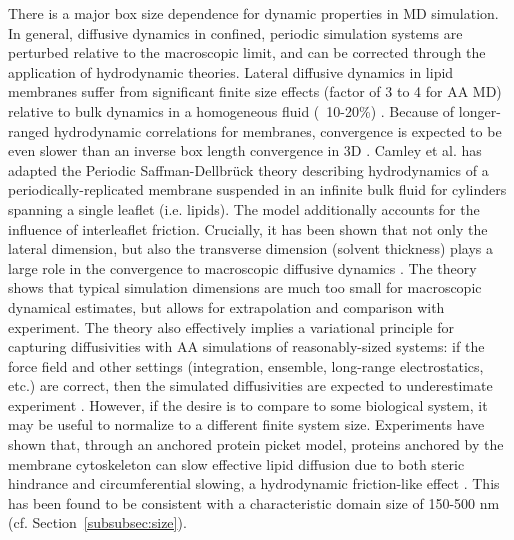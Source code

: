 \documentclass[9pt,bestpractices]{livecoms}
\begin{document}
There is a major box size dependence for dynamic properties in MD simulation.
In general, diffusive dynamics in confined, periodic simulation systems are perturbed relative to the macroscopic limit, and can be corrected through the application of hydrodynamic theories.
Lateral diffusive dynamics in lipid membranes suffer from significant finite size effects (factor of 3 to 4 for AA MD) \cite{Venable2017} relative to bulk dynamics in a homogeneous fluid (~10-20\%) \cite{Yeh2004c}.
Because of longer-ranged hydrodynamic correlations for membranes, convergence is expected to be even slower than an inverse box length convergence in 3D \cite{Camley2013a}.
Camley et al. has adapted the Periodic Saffman-Dellbr\"uck theory describing hydrodynamics of a periodically-replicated membrane suspended in an infinite bulk fluid for cylinders spanning a single leaflet (i.e. lipids).
The model additionally accounts for the influence of interleaflet friction.
Crucially, it has been shown that not only the lateral dimension, but also the transverse dimension (solvent thickness) plays a large role in the convergence to macroscopic diffusive dynamics \cite{Venable2017}.
The theory shows that typical simulation dimensions are much too small for macroscopic dynamical estimates, but allows for extrapolation and comparison with experiment.
The theory also effectively implies a variational principle for capturing diffusivities with AA simulations of reasonably-sized systems: if the force field and other settings (integration, ensemble, long-range electrostatics, etc.) are correct, then the simulated diffusivities are expected to underestimate experiment \cite{Venable2017}.
However, if the desire is to compare to some biological system, it may be useful to normalize to a different finite system size.
Experiments have shown that, through an anchored protein picket model, proteins anchored by the membrane cytoskeleton can slow effective lipid diffusion due to both steric hindrance and circumferential slowing, a hydrodynamic friction-like effect \cite{Morone2006}.
This has been found to be consistent with a characteristic domain size of 150-500 nm \cite{Ritchie2003,Morone2006} (cf. Section~\ref{subsubsec:size}).
\end{document}
